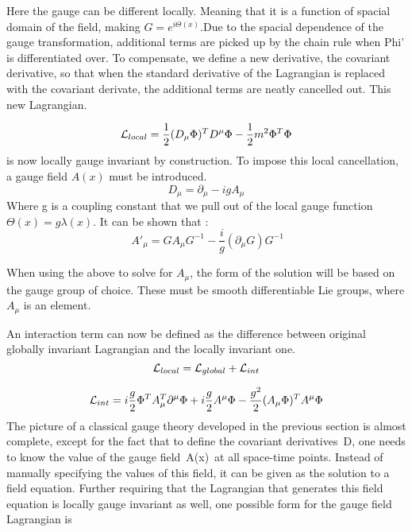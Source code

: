 Here the gauge can be different locally. Meaning that it is a function of spacial domain of the field, making $G = e^{i\Theta(x)}$.Due to the spacial dependence of the gauge transformation, additional terms are picked up by the chain rule when Phi' is differentiated over. To compensate, we define a new derivative, the covariant derivative, so that when the standard derivative of the Lagrangian is replaced with the covariant derivate, the additional terms are neatly cancelled out. This new Lagrangian.

\begin{equation*}
    \mathcal{L}_{local} = \frac{1}{2}(D_{\mu} \Phi)^T D^{\mu}\Phi - \frac{1}{2}m^2\Phi^T\Phi
\end{equation*}
is now locally gauge invariant by construction. To impose this local cancellation, a gauge field $A(x)$ must be introduced.  
\begin{equation*}
    D_{\mu} = \partial_{\mu} - i g A_{\mu}
\end{equation*}
Where g is a coupling constant that we pull out of the local gauge function $\Theta(x) = g\lambda(x) $. It can be shown that :
\begin{equation*}
    {\displaystyle \ A'_{\mu }=GA_{\mu }G^{-1}-{\frac {i}{g}}(\partial _{\mu }G)G^{-1}}
\end{equation*}

When using the above to solve for $A_{\mu}$, the form of the solution will be based on the gauge group of choice. These must be smooth differentiable Lie groups, where $A_{\mu}$ is an element. 

An interaction term can now be defined as the difference between original globally invariant Lagrangian and the locally invariant one. 
\begin{equation*}
    \mathcal{L}_{local} = \mathcal{L}_{global} + \mathcal{L}_{int}
\end{equation*}


\begin{equation*}
    \mathcal{L}_{int} = i\frac{g}{2}\Phi^T A_{\mu}^T \partial^{\mu}\Phi + i\frac{g}{2}A^{\mu}\Phi - \frac{g^2}{2}(A_{\mu}\Phi)^T A^{\mu}\Phi
\end{equation*}
The picture of a classical gauge theory developed in the previous section is almost complete, except for the fact that to define the covariant derivatives D, one needs to know the value of the gauge field A(x) at all space-time points. Instead of manually specifying the values of this field, it can be given as the solution to a field equation. Further requiring that the Lagrangian that generates this field equation is locally gauge invariant as well, one possible form for the gauge field Lagrangian is

